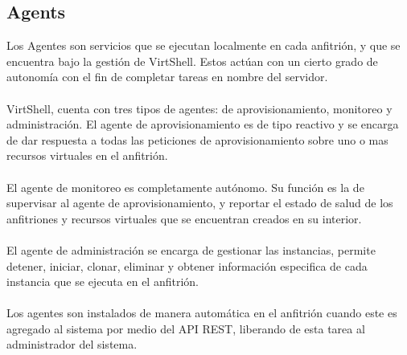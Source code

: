 \subsection{Agents}
Los Agentes son servicios que se ejecutan localmente en cada anfitrión, y que se encuentra bajo la gestión de VirtShell. Estos actúan con un cierto grado de autonomía con el fin de completar tareas en nombre del servidor.\\
\\ 
VirtShell, cuenta con tres tipos de agentes: de aprovisionamiento, monitoreo y administración. El agente de aprovisionamiento es de tipo reactivo y se encarga de dar respuesta a todas las peticiones de aprovisionamiento sobre uno o mas recursos virtuales en el anfitrión.\\
\\
El agente de monitoreo es completamente autónomo. Su función es la de supervisar al agente de aprovisionamiento, y reportar el estado de salud de los anfitriones y recursos virtuales que se encuentran creados en su interior.\\
\\
El agente de administración se encarga de gestionar las instancias, permite detener, iniciar, clonar, eliminar y obtener información especifica de cada instancia que se ejecuta en el anfitrión.\\
\\
Los agentes son instalados de manera automática en el anfitrión cuando este es agregado al sistema por medio del API REST, liberando de esta tarea al administrador del sistema.

